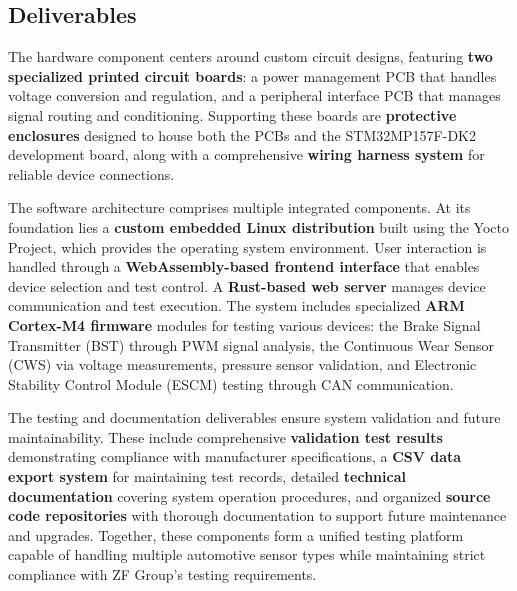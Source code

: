 \documentclass[12pt]{article}
\begin{document}
\subsection{Deliverables}
The hardware component centers around custom circuit designs, featuring
\textbf{two specialized printed circuit boards}: a power management PCB that
handles voltage conversion and regulation, and a peripheral interface PCB that
manages signal routing and conditioning. Supporting these boards are
\textbf{protective enclosures} designed to house both the PCBs and the
STM32MP157F-DK2 development board, along with a comprehensive \textbf{wiring
harness system} for reliable device connections.

The software architecture comprises multiple integrated components. At its
foundation lies a \textbf{custom embedded Linux distribution} built using the
Yocto Project, which provides the operating system environment. User
interaction is handled through a \textbf{WebAssembly-based frontend interface}
that enables device selection and test control. A \textbf{Rust-based web
server} manages device communication and test execution. The system includes
specialized \textbf{ARM Cortex-M4 firmware} modules for testing various
devices: the Brake Signal Transmitter (BST) through PWM signal analysis, the
Continuous Wear Sensor (CWS) via voltage measurements, pressure sensor
validation, and Electronic Stability Control Module (ESCM) testing through CAN
communication.

The testing and documentation deliverables ensure system validation and future
maintainability. These include comprehensive \textbf{validation test results}
demonstrating compliance with manufacturer specifications, a \textbf{CSV data
export system} for maintaining test records, detailed \textbf{technical
documentation} covering system operation procedures, and organized
\textbf{source code repositories} with thorough documentation to support future
maintenance and upgrades. Together, these components form a unified testing
platform capable of handling multiple automotive sensor types while maintaining
strict compliance with ZF Group's testing requirements.

% 
\end{document}
